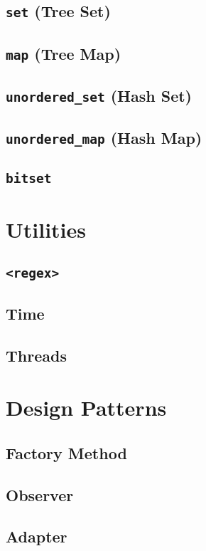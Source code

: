 \documentclass[letterpaper,10pt]{book}
\newcommand{\code}[1]{\texttt{#1}}
\begin{document}
\chapter{\code{set} (Tree Set)}
\chapter{\code{map} (Tree Map)}
\chapter{\code{unordered\_set} (Hash Set)}
\chapter{\code{unordered\_map} (Hash Map)}
\chapter{\code{bitset}}

\part{Utilities}



%




\chapter{\code{<regex>}}\label{ch:regex}
\chapter{Time}\label{ch:time}
\chapter{Threads}\label{ch:threads}


\part{Design Patterns}
\chapter{Factory Method}
\chapter{Observer}
\chapter{Adapter}
\end{document}
